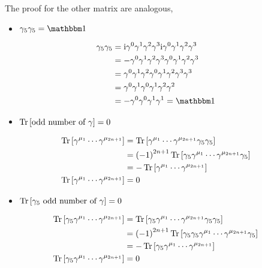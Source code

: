 The proof for the other matrix are analogous,

\begin{itemize}
    \item $\gamma_5\gamma_5=\mathbbm 1$
\end{itemize}

\begin{align}
    \gamma_5\gamma_5&=\im\gamma^0\gamma^1\gamma^2\gamma^3\im\gamma^0\gamma^1\gamma^2\gamma^3\nonumber\\
    &=-\gamma^0\gamma^1\gamma^2\gamma^3\gamma^0\gamma^1\gamma^2\gamma^3\nonumber\\
    &=\gamma^0\gamma^1\gamma^2\gamma^0\gamma^1\gamma^2\gamma^3\gamma^3\nonumber\\
    &=\gamma^0\gamma^1\gamma^0\gamma^1\gamma^2\gamma^2\nonumber\\
    &=-\gamma^0\gamma^0\gamma^1\gamma^1=\mathbbm 1\nonumber
\end{align}

\begin{itemize}
    \item $\Tr\qty[\textnormal{odd number of }\gamma]=0$
\end{itemize}

\begin{align}
    \Tr\qty[\gamma^{\mu_1}\cdots\gamma^{\mu_{2n+1}}]&=\Tr\qty[\gamma^{\mu_1}\cdots\gamma^{\mu_{2n+1}}\gamma_5\gamma_5]\nonumber\\
    &=\qty(-1)^{2n+1}\Tr\qty[\gamma_5\gamma^{\mu_1}\cdots\gamma^{\mu_{2n+1}}\gamma_5]\nonumber\\
    &=-\Tr\qty[\gamma^{\mu_1}\cdots\gamma^{\mu_{2n+1}}]\nonumber\\
    \Tr\qty[\gamma^{\mu_1}\cdots\gamma^{\mu_{2n+1}}]&=0\nonumber
\end{align}

\begin{itemize}
    \item $\Tr\qty[\gamma_5\textnormal{ odd number of }\gamma]=0$
\end{itemize}

\begin{align}
    \Tr\qty[\gamma_5\gamma^{\mu_1}\cdots\gamma^{\mu_{2n+1}}]&=\Tr\qty[\gamma_5\gamma^{\mu_1}\cdots\gamma^{\mu_{2n+1}}\gamma_5\gamma_5]\nonumber\\
    &=\qty(-1)^{2n+1}\Tr\qty[\gamma_5\gamma_5\gamma^{\mu_1}\cdots\gamma^{\mu_{2n+1}}\gamma_5]\nonumber\\
    &=-\Tr\qty[\gamma_5\gamma^{\mu_1}\cdots\gamma^{\mu_{2n+1}}]\nonumber\\
    \Tr\qty[\gamma_5\gamma^{\mu_1}\cdots\gamma^{\mu_{2n+1}}]&=0\nonumber
\end{align}

